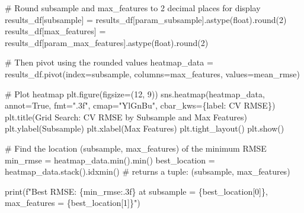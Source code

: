 \documentclass[
  letterpaper,
  DIV=11,
  numbers=noendperiod]{scrreprt}
\newenvironment{Shaded}{\begin{snugshade}}{\end{snugshade}}
\newcommand{\BuiltInTok}[1]{\textcolor[rgb]{0.00,0.23,0.31}{#1}}
\newcommand{\CommentTok}[1]{\textcolor[rgb]{0.37,0.37,0.37}{#1}}
\newcommand{\DecValTok}[1]{\textcolor[rgb]{0.68,0.00,0.00}{#1}}
\newcommand{\NormalTok}[1]{\textcolor[rgb]{0.00,0.23,0.31}{#1}}
\newcommand{\OperatorTok}[1]{\textcolor[rgb]{0.37,0.37,0.37}{#1}}
\newcommand{\SpecialCharTok}[1]{\textcolor[rgb]{0.37,0.37,0.37}{#1}}
\newcommand{\SpecialStringTok}[1]{\textcolor[rgb]{0.13,0.47,0.30}{#1}}
\newcommand{\StringTok}[1]{\textcolor[rgb]{0.13,0.47,0.30}{#1}}
\newcommand{\VariableTok}[1]{\textcolor[rgb]{0.07,0.07,0.07}{#1}}
\begin{document}
\begin{Shaded}
\begin{Highlighting}[]
\CommentTok{\# Round subsample and max\_features to 2 decimal places for display}
\NormalTok{results\_df[}\StringTok{\textquotesingle{}subsample\textquotesingle{}}\NormalTok{] }\OperatorTok{=}\NormalTok{ results\_df[}\StringTok{\textquotesingle{}param\_subsample\textquotesingle{}}\NormalTok{].astype(}\BuiltInTok{float}\NormalTok{).}\BuiltInTok{round}\NormalTok{(}\DecValTok{2}\NormalTok{)}
\NormalTok{results\_df[}\StringTok{\textquotesingle{}max\_features\textquotesingle{}}\NormalTok{] }\OperatorTok{=}\NormalTok{ results\_df[}\StringTok{\textquotesingle{}param\_max\_features\textquotesingle{}}\NormalTok{].astype(}\BuiltInTok{float}\NormalTok{).}\BuiltInTok{round}\NormalTok{(}\DecValTok{2}\NormalTok{)}

\CommentTok{\# Then pivot using the rounded values}
\NormalTok{heatmap\_data }\OperatorTok{=}\NormalTok{ results\_df.pivot(index}\OperatorTok{=}\StringTok{\textquotesingle{}subsample\textquotesingle{}}\NormalTok{, columns}\OperatorTok{=}\StringTok{\textquotesingle{}max\_features\textquotesingle{}}\NormalTok{, values}\OperatorTok{=}\StringTok{\textquotesingle{}mean\_rmse\textquotesingle{}}\NormalTok{)}

\CommentTok{\# Plot heatmap}
\NormalTok{plt.figure(figsize}\OperatorTok{=}\NormalTok{(}\DecValTok{12}\NormalTok{, }\DecValTok{9}\NormalTok{))}
\NormalTok{sns.heatmap(heatmap\_data, annot}\OperatorTok{=}\VariableTok{True}\NormalTok{, fmt}\OperatorTok{=}\StringTok{".3f"}\NormalTok{, cmap}\OperatorTok{=}\StringTok{"YlGnBu"}\NormalTok{, cbar\_kws}\OperatorTok{=}\NormalTok{\{}\StringTok{\textquotesingle{}label\textquotesingle{}}\NormalTok{: }\StringTok{\textquotesingle{}CV RMSE\textquotesingle{}}\NormalTok{\})}
\NormalTok{plt.title(}\StringTok{\textquotesingle{}Grid Search: CV RMSE by Subsample and Max Features\textquotesingle{}}\NormalTok{)}
\NormalTok{plt.ylabel(}\StringTok{\textquotesingle{}Subsample\textquotesingle{}}\NormalTok{)}
\NormalTok{plt.xlabel(}\StringTok{\textquotesingle{}Max Features\textquotesingle{}}\NormalTok{)}
\NormalTok{plt.tight\_layout()}
\NormalTok{plt.show()}

\CommentTok{\# Find the location (subsample, max\_features) of the minimum RMSE}
\NormalTok{min\_rmse }\OperatorTok{=}\NormalTok{ heatmap\_data.}\BuiltInTok{min}\NormalTok{().}\BuiltInTok{min}\NormalTok{()}
\NormalTok{best\_location }\OperatorTok{=}\NormalTok{ heatmap\_data.stack().idxmin()  }\CommentTok{\# returns a tuple: (subsample, max\_features)}

\BuiltInTok{print}\NormalTok{(}\SpecialStringTok{f"Best RMSE: }\SpecialCharTok{\{}\NormalTok{min\_rmse}\SpecialCharTok{:.3f\}}\SpecialStringTok{ at subsample = }\SpecialCharTok{\{}\NormalTok{best\_location[}\DecValTok{0}\NormalTok{]}\SpecialCharTok{\}}\SpecialStringTok{, max\_features = }\SpecialCharTok{\{}\NormalTok{best\_location[}\DecValTok{1}\NormalTok{]}\SpecialCharTok{\}}\SpecialStringTok{"}\NormalTok{)}
\end{Highlighting}
\end{Shaded}
\end{document}
